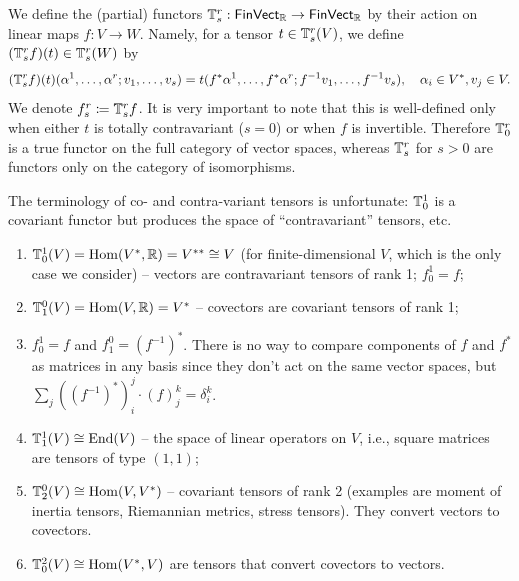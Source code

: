 \begin{defn}
    We define the (partial) functors $\mathbb{T}^r_s:\mathsf{FinVect_{\mathbb{R}} }\to\mathsf{FinVect}_{\mathbb{R}} $ by their action on linear maps $f:V\to W$. Namely, for a tensor $t\in \mathbb{T}^r_s(V)$, we define $(\mathbb{T}^r_sf)(t)\in \mathbb{T}^r_s(W)$ by
    \[
    (\mathbb{T}^r_sf)(t)(\alpha^1,\ldots,\alpha^r;v_1,\ldots,v_s)=t(f^\ast\alpha^1,\ldots,f^\ast\alpha^r;f^{-1}v_1,\ldots,f^{-1}v_s), \quad \alpha_i\in V^\ast,v_j\in V.
    \]
    We denote $f^r_s\coloneqq \mathbb{T}^r_s f$. It is very important to note that this is well-defined only when either $t$ is totally contravariant ($s=0$) or when $f$ is invertible. Therefore $\mathbb{T}^r_0$ is a true functor on the full category of vector spaces, whereas $\mathbb{T}^r_s$ for $s>0$ are functors only on the category of isomorphisms.
\end{defn}


\begin{rem}
    The terminology of co- and contra-variant tensors is unfortunate: $\mathbb{T}_0^1$ is a covariant functor but produces the space of ``contravariant'' tensors, etc.
\end{rem}

\begin{example}
\begin{enumerate}
    \item $\mathbb{T}_0^1(V)=\operatorname{Hom}(V^\ast,\mathbb{R} )=V^{\ast\ast}\cong V$ (for finite-dimensional $V$, which is the only case we consider) -- vectors are contravariant tensors of rank 1; $f^1_0=f$;
    \item $\mathbb{T}_1^0(V)=\operatorname{Hom}(V,\mathbb{R} )=V^\ast$ -- covectors are covariant tensors of rank 1;
    \item $f^1_0=f$ and $f^0_1=\left(f^{-1}\right)^\ast$. There is no way to compare components of $f$ and $f^\ast$ as matrices in any basis since they don't act on the same vector spaces, but $\sum_j \left(\left(f^{-1}\right)^\ast\right)_i^j \cdot (f)_j^k=\delta_i^k$.
    \item $\mathbb{T}^1_1(V)\cong \operatorname{End}(V)$ -- the space of linear operators on $V$, i.e., square matrices are tensors of type $(1,1)$;
    \item $\mathbb{T}^0_2(V)\cong\operatorname{Hom}(V,V^\ast)$ -- covariant tensors of rank 2 (examples are moment of inertia tensors, Riemannian metrics, stress tensors). They convert vectors to covectors.
    \item $\mathbb{T}^2_0(V)\cong\operatorname{Hom}(V^\ast ,V)$ are tensors that convert covectors to vectors.
\end{enumerate}
\end{example}

